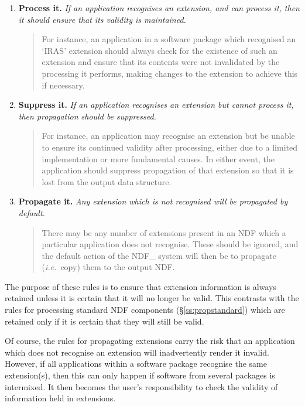\documentclass[twoside,11pt]{article}
\newcommand{\st}[1]{{\em{#1}}}
\begin{document}
\begin{enumerate}

\item {\bf Process it.}
\st{If an application recognises an extension, and can process it, then it
should ensure that its validity is maintained.} 

\small
\begin{quote}
For instance, an application in a software package which recognised an
`IRAS' extension should always check for the existence of such an extension
and ensure that its contents were not invalidated by the processing it
performs, making changes to the extension to achieve this if necessary. 
\end{quote}
\normalsize

\item {\bf Suppress it.}
\st{If an application recognises an extension but cannot process it, then 
propagation should be suppressed.}

\small
\begin{quote}
For instance, an application may recognise an extension but be unable to 
ensure its continued validity after processing, either due to a limited 
implementation or more fundamental causes.
In either event, the application should suppress propagation of that 
extension so that it is lost from the output data structure.
\end{quote}
\normalsize

\item {\bf Propagate it.}
\st{Any extension which is not recognised will be propagated by default.} 

\small
\begin{quote}
There may be any number of extensions present in an NDF which a particular 
application does not recognise.
These should be ignored, and the default action of the NDF\_ system will 
then be to propagate (\st{i.e.}\ copy) them to the output NDF.
\end{quote}
\normalsize


\end{enumerate}

The purpose of these rules is to ensure that extension information is always
retained unless it is certain that it will no longer be valid.
This contrasts with the rules for processing standard NDF components
(\S\ref{ss:propstandard}) which are retained only if it is certain that they
will still be valid. 

Of course, the rules for propagating extensions carry the risk that an
application which does not recognise an extension will inadvertently render
it invalid.
However, if all applications within a software package recognise the same
extension(s), then this can only happen if software from several packages is
intermixed. 
It then becomes the user's responsibility to check the validity of
information held in extensions. 
\end{document}
